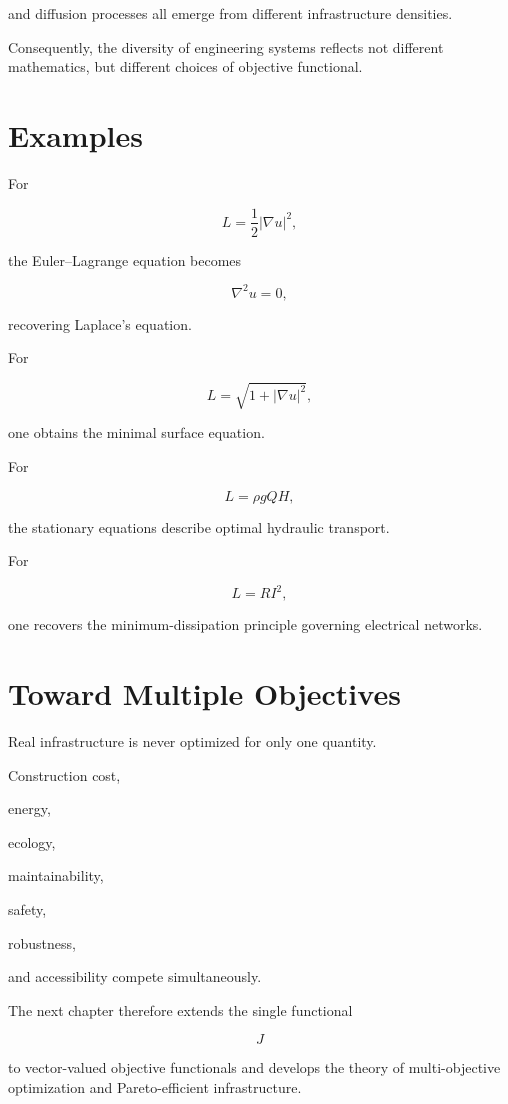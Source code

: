 \documentclass[11pt,fleqn]{book}
\numberwithin{equation}{chapter}
\theoremstyle{plain}
\theoremstyle{definition}
\theoremstyle{remark}
\begin{document}
and diffusion processes all emerge from different infrastructure
densities.

Consequently, the diversity of engineering systems reflects not
different mathematics, but different choices of objective functional.


\section{Examples}

For

\[
L
=
\frac12
|\nabla u|^2,
\]

the Euler--Lagrange equation becomes

\[
\nabla^2u=0,
\]

recovering Laplace's equation.

For

\[
L
=
\sqrt{1+|\nabla u|^2},
\]

one obtains the minimal surface equation.

For

\[
L
=
\rho gQH,
\]

the stationary equations describe optimal hydraulic transport.

For

\[
L
=
RI^2,
\]

one recovers the minimum-dissipation principle governing electrical
networks.


\section{Toward Multiple Objectives}

Real infrastructure is never optimized for only one quantity.

Construction cost,

energy,

ecology,

maintainability,

safety,

robustness,

and accessibility compete simultaneously.

The next chapter therefore extends the single functional

\[
J
\]

to vector-valued objective functionals and develops the theory of
multi-objective optimization and Pareto-efficient infrastructure.
\end{document}
